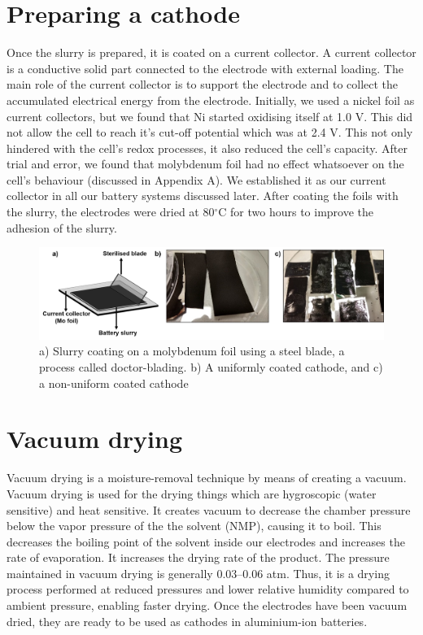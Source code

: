 \section{Preparing a cathode}
Once the slurry is prepared, it is coated on a current collector. A current collector is a conductive solid part connected to the electrode with external loading. The main role of the current collector is to support the electrode and to collect the accumulated electrical energy from the electrode\cite{sun_effect_2017}. Initially, we used a  nickel foil as current collectors, but we found that Ni started oxidising itself at 1.0 V. This did not allow the cell to reach it's cut-off potential which was at 2.4 V. This not only hindered with the cell's redox processes, it also reduced the cell's capacity. After trial and error, we found that molybdenum foil had no effect whatsoever on the cell's behaviour (discussed in Appendix A). We established it as our current collector in all our battery systems discussed later. After coating the foils with the slurry, the electrodes were dried at 80$^{\circ}$C for two hours to improve the adhesion of the slurry. 
\begin{figure}[tbh!]
\centering
\includegraphics[width=\textwidth]{Figures/chap3fig/coating}
\caption{a) Slurry coating on a molybdenum foil using a steel blade, a process called doctor-blading. b) A uniformly coated cathode, and c) a non-uniform coated cathode}
\label{Figures/chap3fig:coating}
\end{figure}
\section{Vacuum drying}
Vacuum drying is a moisture-removal technique by means of creating a vacuum. Vacuum drying is used for the drying things which are hygroscopic (water sensitive) and heat sensitive. It creates vacuum to decrease the chamber pressure below the vapor pressure of the the solvent (NMP), causing it to boil. This decreases the boiling point of the solvent inside our electrodes and increases the rate of evaporation. It increases the drying rate of the product. The pressure maintained in vacuum drying is generally 0.03–0.06 atm. Thus, it is a drying process performed at reduced pressures and lower relative humidity compared to ambient pressure, enabling faster drying. Once the electrodes have been vacuum dried, they are ready to be used as cathodes in aluminium-ion batteries. 
